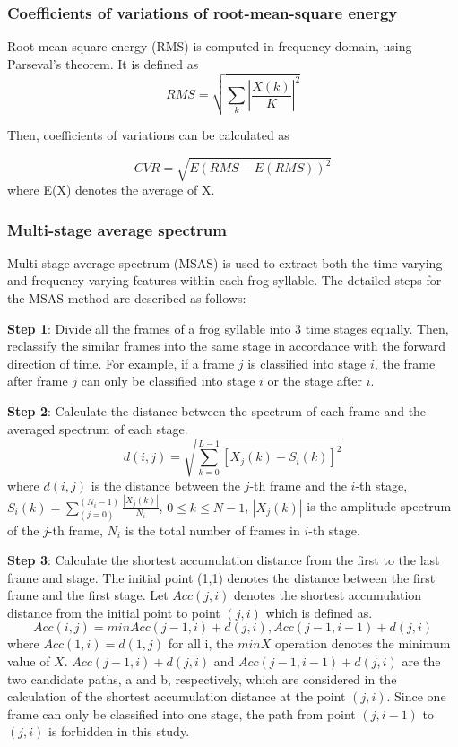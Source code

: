 \subsubsection{Coefficients of variations of root-mean-square energy}
Root-mean-square energy (RMS) is computed in frequency domain, using Parseval’s theorem. It is defined as
\begin{equation}
RMS = \sqrt{\sum_{k}|\frac{X(k)}{K}|^{2}}
\end{equation}

Then, coefficients of variations can be calculated as

\begin{equation}
CVR=\sqrt{E(RMS-E(RMS))^{2}}
\end{equation} 
where E(X) denotes the average of X.

\subsubsection{Multi-stage average spectrum}
Multi-stage average spectrum (MSAS) is used to extract both the time-varying and frequency-varying features within each frog syllable. The detailed steps for the MSAS method are described as follows:

\noindent \textbf{Step 1}:   Divide all the frames of a frog syllable into 3 time stages equally. Then, reclassify the similar frames into the same stage in accordance with the forward direction of time. For example, if a frame $j$ is classified into stage $i$, the frame after frame $j$ can only be classified into stage $i$ or the stage after $i$.

\noindent \textbf{Step 2}:  Calculate the distance between the spectrum of each frame and the averaged spectrum of each stage.
\begin{equation}
d(i,j)=\sqrt{\sum_{k=0}^{L-1}[X_{j}(k)-S_{i}(k)]^{2}}
\end{equation}
where $d(i,j)$ is the distance between the $j$-th frame and the $i$-th stage, $S_{i}(k)=\sum_(j=0)^(N_{i}-1)\frac{|X_{j} (k)|}{N_{i}}$, $0 \leq k \leq N-1$, $|X_{j}(k)|$ is the amplitude spectrum of the $j$-th frame, $N_{i}$ is the total number of frames in $i$-th stage.

\noindent \textbf{Step 3}: Calculate the shortest accumulation distance from the first to the last frame and stage. 
The initial point (1,1) denotes the distance between the first frame and the first stage. Let $Acc(j,i)$ denotes the shortest accumulation distance from the initial point to point $(j,i)$ which is defined as.
\begin{equation}
Acc(i,j)=min{Acc(j-1,i)+d(j,i),Acc(j-1,i-1)+d(j,i)} 
\end{equation}
where $Acc(1,i)=d(1,j)$ for all i, the $min{X}$ operation denotes the minimum value of $X$. $Acc(j-1,i)+d(j,i)$ and $Acc(j-1,i-1)+d(j,i)$ are the two candidate paths, a and b, respectively, which are considered in the calculation of the shortest accumulation distance at the point $(j,i)$. Since one frame can only be classified into one stage, the path from point $(j,i-1)$ to $(j,i)$ is forbidden in this study.

